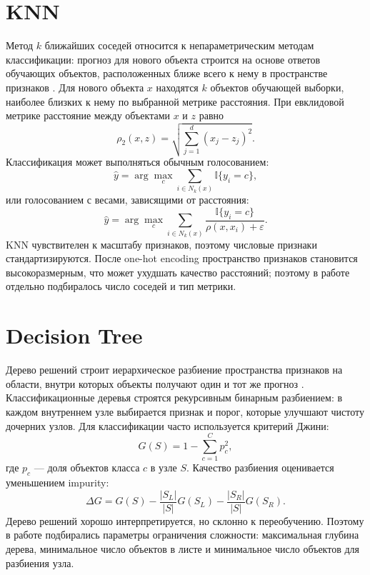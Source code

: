 \documentclass[14pt,a4paper]{extreport}
\begin{document}
\section{KNN}
Метод $k$ ближайших соседей относится к непараметрическим методам классификации: прогноз для нового объекта строится на основе ответов обучающих объектов, расположенных ближе всего к нему в пространстве признаков \cite{knn}. Для нового объекта $x$ находятся $k$ объектов обучающей выборки, наиболее близких к нему по выбранной метрике расстояния. При евклидовой метрике расстояние между объектами $x$ и $z$ равно
\begin{equation}
\rho_2(x,z)=\sqrt{\sum_{j=1}^{d}(x_j-z_j)^2}.
\end{equation}
Классификация может выполняться обычным голосованием:
\begin{equation}
\hat{y}=\arg\max_{c}\sum_{i\in N_k(x)}\mathbb{I}\{y_i=c\},
\end{equation}
или голосованием с весами, зависящими от расстояния:
\begin{equation}
\hat{y}=\arg\max_{c}\sum_{i\in N_k(x)}\frac{\mathbb{I}\{y_i=c\}}{\rho(x,x_i)+\varepsilon}.
\end{equation}
KNN чувствителен к масштабу признаков, поэтому числовые признаки стандартизируются. После one-hot encoding пространство признаков становится высокоразмерным, что может ухудшать качество расстояний; поэтому в работе отдельно подбиралось число соседей и тип метрики.

\section{Decision Tree}
Дерево решений строит иерархическое разбиение пространства признаков на области, внутри которых объекты получают один и тот же прогноз \cite{cart}. Классификационные деревья строятся рекурсивным бинарным разбиением: в каждом внутреннем узле выбирается признак и порог, которые улучшают чистоту дочерних узлов. Для классификации часто используется критерий Джини:
\begin{equation}
G(S)=1-\sum_{c=1}^{C}p_c^2,
\end{equation}
где $p_c$ --- доля объектов класса $c$ в узле $S$. Качество разбиения оценивается уменьшением impurity:
\begin{equation}
\Delta G=G(S)-\frac{|S_L|}{|S|}G(S_L)-\frac{|S_R|}{|S|}G(S_R).
\end{equation}
Дерево решений хорошо интерпретируется, но склонно к переобучению. Поэтому в работе подбирались параметры ограничения сложности: максимальная глубина дерева, минимальное число объектов в листе и минимальное число объектов для разбиения узла.
\end{document}
